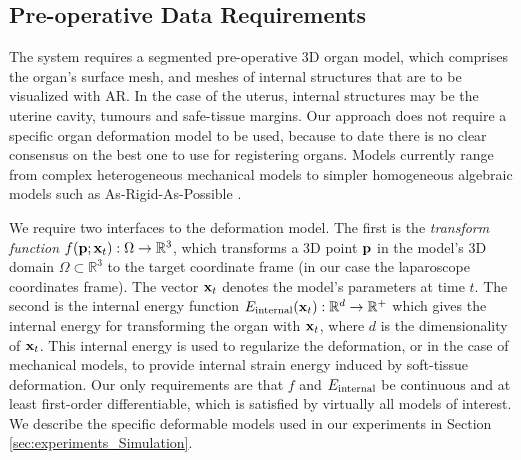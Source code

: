 \subsection{Pre-operative Data Requirements}
\label{sec:inputModels}
The system requires a segmented pre-operative 3D organ model, which comprises the organ's surface mesh, and meshes of internal structures that are to be visualized with AR.
In the case of the uterus, internal structures may be the uterine cavity, tumours and safe-tissue margins. %
Our approach does not require a specific organ deformation model to be used, because to date there is no clear consensus on the best one to use for registering organs. Models currently range from complex heterogeneous mechanical models to simpler homogeneous algebraic models such as As-Rigid-As-Possible \cite{Sorkine:2007:ASM:1281991.1282006}. 

We require two interfaces to the deformation model. The first is the \emph{transform function} $f(\mathbf{p};\mathbf{x}_t): \Omega\rightarrow \mathbb{R}^3$, which transforms a 3D point $\mathbf{p}$ in the model's 3D domain $\Omega\subset \mathbb{R}^3$ to the target coordinate frame (in our case the laparoscope coordinates frame). The vector $\mathbf{x}_t$ denotes the model's parameters at time $t$. %
The second is the internal energy function $E_{\text{internal}}(\mathbf{x}_{t}):\mathbb{R}^{d}\rightarrow\mathbb{R}^{+}$ which gives the internal energy for transforming the organ with $\mathbf{x}_t$, where $d$ is the dimensionality of $\mathbf{x}_{t}$. This internal energy is used to regularize the deformation, or in the case of mechanical models, to provide internal strain energy induced by soft-tissue deformation.
Our only requirements are that $f$ and $E_{\text{internal}}$ be continuous and at least first-order differentiable, which is satisfied by virtually all models of interest. We describe the specific deformable models used in our experiments in Section \ref{sec:experiments_Simulation}.
 
